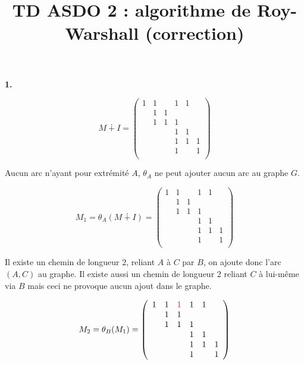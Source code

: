 \documentclass{article}
\title{\textbf{TD ASDO 2 : algorithme de Roy-Warshall (correction)}}
\begin{document}
\maketitle

\textbf{1. } 

\begin{equation}
  M \dotplus I = \left(
    \begin{array}{cccccc}
      1 & 1 && 1 & 1 & \\
      & 1 & 1 &&& \\
      & 1 & 1 & 1 && \\
      &&& 1 & 1 & \\
      &&& 1 & 1 & 1 \\
      &&& 1 & & 1 \\
    \end{array}
    \right)
\end{equation}

Aucun arc n'ayant pour extrémité $A$, $\theta_A$ ne peut ajouter aucun
arc au graphe $G$.

\begin{equation}
  M_1 = \theta_A(M \dotplus I) = \left(
    \begin{array}{cccccc}
      1 & 1 && 1 & 1 & \\
      & 1 & 1 &&& \\
      & 1 & 1 & 1 && \\
      &&& 1 & 1 & \\
      &&& 1 & 1 & 1 \\
      &&& 1 & & 1 \\
    \end{array}
    \right)
\end{equation}

Il existe un chemin de longueur 2, reliant $A$ à $C$ par $B$, on ajoute donc
l'arc $(A,C)$ au graphe. Il existe aussi un chemin de longueur 2
reliant $C$ à lui-même via $B$ mais ceci ne provoque aucun ajout dans
le graphe. 

\begin{equation}
  M_2 = \theta_B(M_1) = \left(
    \begin{array}{cccccc}
      1 & 1 & {\color{red} 1} & 1 & 1 & \\
      & 1 & 1 &&& \\
      & 1 & 1 & 1 && \\
      &&& 1 & 1 & \\
      &&& 1 & 1 & 1 \\
      &&& 1 & & 1 \\
    \end{array}
    \right)
\end{equation}
\end{document}
